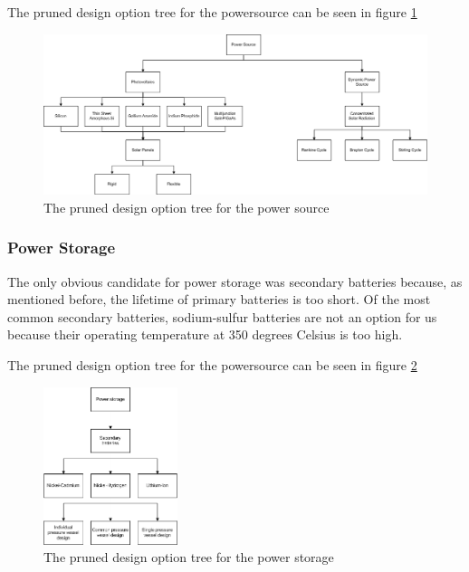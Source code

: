 The pruned design option tree for the powersource can be seen in figure \ref{fig:DOTeps_sourcePruned}

\begin{figure}
\centering
\includegraphics[width=\textheight, angle=90]{chapters/img/DOTeps_sourcePruned.png}
\caption{The pruned design option tree for the power source}
\label{fig:DOTeps_sourcePruned}
\end{figure}

\subsubsection{Power Storage}
\label{pruneEPS:Storage}
The only obvious candidate for power storage was secondary batteries because, as mentioned before, the lifetime of primary batteries is too short.
Of the most common secondary batteries, sodium-sulfur batteries are not an option for us because their operating temperature at 350 degrees Celsius is too high.

The pruned design option tree for the powersource can be seen in figure \ref{fig:DOTeps_storagePruned}

\begin{figure}
\centering
\includegraphics[width=0.35\textwidth]{chapters/img/DOTeps_storagePruned.png}
\caption{The pruned design option tree for the power storage}
\label{fig:DOTeps_storagePruned}
\end{figure}

